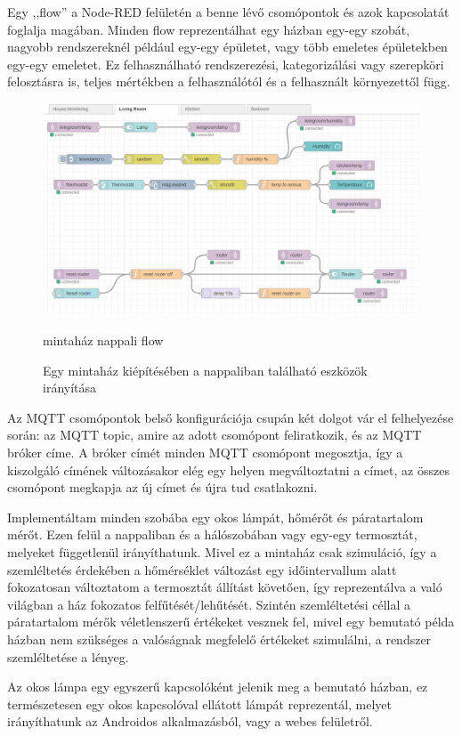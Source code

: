\documentclass[
]{thesis-ekf}
\theoremstyle{definition}
\theoremstyle{remark}
\begin{document}
Egy ,,flow'' a Node-RED felületén a benne lévő csomópontok és azok kapcsolatát foglalja magában. 
Minden flow reprezentálhat egy házban egy-egy szobát, nagyobb rendszereknél például egy-egy épületet, 
vagy több emeletes épületekben egy-egy emeletet. Ez felhasználható rendszerezési,
kategorizálási vagy szerepköri felosztásra is, teljes mértékben a felhasználótól és a felhasznált
környezettől függ.

\begin{figure}[h]
	\includegraphics[width=1\textwidth]{images/flow.png}
	\caption{mintaház nappali flow}
	\caption{Egy mintaház kiépítésében a nappaliban található eszközök irányítása}
\end{figure}

Az MQTT csomópontok belső konfigurációja csupán két dolgot vár el felhelyezése során: az MQTT topic, amire az adott csomópont feliratkozik, és az MQTT bróker címe. A bróker címét minden MQTT csomópont megosztja, így a kiszolgáló címének változásakor
elég egy helyen megváltoztatni a címet, az összes csomópont megkapja az új címet és újra tud csatlakozni.

Implementáltam minden szobába egy okos lámpát, hőmérőt és páratartalom mérőt. Ezen felül a nappaliban és a hálószobában vagy egy-egy termosztát, melyeket függetlenül irányíthatunk. Mivel ez a mintaház csak szimuláció, így a szemléltetés érdekében
a hőmérséklet változást egy időintervallum alatt fokozatosan változtatom a termosztát állítást követően, így reprezentálva a való világban a ház fokozatos felfűtését/lehűtését. Szintén szemléltetési céllal a páratartalom mérők
véletlenszerű értékeket vesznek fel, mivel egy bemutató példa házban nem szükséges a valóságnak megfelelő értékeket szimulálni, a rendszer szemléltetése a lényeg.

Az okos lámpa egy egyszerű kapcsolóként jelenik meg a bemutató házban, ez természetesen egy okos kapcsolóval ellátott lámpát reprezentál, melyet irányíthatunk az Androidos alkalmazásból, vagy a webes felületről.
\end{document}
